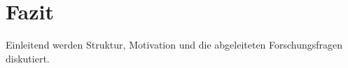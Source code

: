 \chapter{Fazit}

Einleitend werden Struktur, Motivation und die abgeleiteten Forschungsfragen diskutiert.